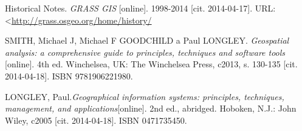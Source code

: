 \documentclass[a4paper,12pt]{article}
\begin{document}
\begin{thebibliography}{99}
Historical Notes. \textit{GRASS GIS} [online]. 1998-2014 [cit. 2014-04-17]. URL:\textless\url {http://grass.osgeo.org/home/history/}

SMITH, Michael J, Michael F GOODCHILD a Paul LONGLEY. \textit{Geospatial analysis: a comprehensive guide to principles, techniques and software tools} [online]. 4th ed. Winchelsea, UK: The Winchelsea Press, c2013, s. 130-135 [cit. 2014-04-18]. ISBN 9781906221980.

LONGLEY, Paul.\textit{Geographical information systems: principles, techniques, management, and applications}[online]. 2nd ed., abridged. Hoboken, N.J.: John Wiley, c2005 [cit. 2014-04-18]. ISBN 0471735450.


\end{thebibliography}
\end{document}

